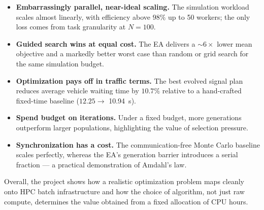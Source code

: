 \documentclass[11pt,a4paper]{article}
\begin{document}
\begin{itemize}
  \item \textbf{Embarrassingly parallel, near-ideal scaling.} The simulation
        workload scales almost linearly, with efficiency above $98\%$ up to 50
        workers; the only loss comes from task granularity at $N=100$.
  \item \textbf{Guided search wins at equal cost.} The EA delivers a $\sim6\times$
        lower mean objective and a markedly better worst case than random or grid
        search for the same simulation budget.
  \item \textbf{Optimization pays off in traffic terms.} The best evolved signal
        plan reduces average vehicle waiting time by $10.7\%$ relative to a
        hand-crafted fixed-time baseline ($12.25 \rightarrow$ \SI{10.94}{\second}).
  \item \textbf{Spend budget on iterations.} Under a fixed budget, more
        generations outperform larger populations, highlighting the value of
        selection pressure.
  \item \textbf{Synchronization has a cost.} The communication-free Monte Carlo
        baseline scales perfectly, whereas the EA's generation barrier introduces
        a serial fraction --- a practical demonstration of Amdahl's law.
\end{itemize}

Overall, the project shows how a realistic optimization problem maps cleanly onto
HPC batch infrastructure and how the choice of algorithm, not just raw compute,
determines the value obtained from a fixed allocation of CPU hours.
\end{document}
